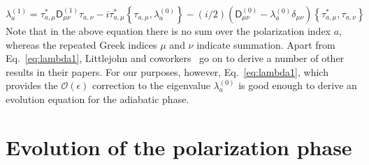%
\begin{equation}
  \lambda^{(1)}_{a} = \tau_{a,\mu}^{*}\mathsf{D}_{\mu\nu}^{(1)}\tau_{a,\nu} - i\tau_{a,\mu}^{*}\left\{\tau_{a,\mu}, \lambda^{(0)}_{a}\right\} - (i/2)\left(\mathsf{D}^{(0)}_{\mu\nu} - \lambda^{(0)}_{a}\delta_{\mu\nu}\right)\left\{\tau_{a,\mu}^{*}, \tau_{a,\nu}\right\}
  \label{eq:lambda1}
\end{equation}
%
Note that in the above equation there is no sum over the polarization index $a$, whereas the repeated Greek indices $\mu$ and $\nu$ indicate summation.
Apart from Eq.~\eqref{eq:lambda1}, Littlejohn and coworkers~\cite{littlejohn1991,littlejohn1991a,weigert1993} go on to derive a number of other results in their papers. 
For our purposes, however, Eq.~\eqref{eq:lambda1}, which provides the $\mathcal{O}(\epsilon)$ correction to the eigenvalue $\lambda_{a}^{(0)}$ is good enough to derive an evolution equation for the adiabatic phase.

\section{Evolution of the polarization phase}

